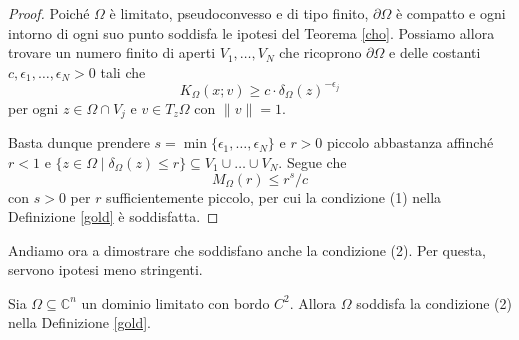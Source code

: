 \begin{proof}
    Poiché $\Omega$ è limitato, pseudoconvesso e di tipo finito, $\partial\Omega$ è compatto e ogni intorno di ogni suo punto soddisfa le ipotesi del Teorema \ref{cho}. Possiamo allora trovare un numero finito di aperti $V_1,\dots, V_N$ che ricoprono $\partial\Omega$ e delle costanti $c,\epsilon_1,\dots,\epsilon_N>0$ tali che
    $$K_\Omega(x;v) \ge c\cdot\delta_\Omega(z)^{-\epsilon_j}$$
    per ogni $z\in\Omega\cap V_j$ e $v\in T_z\Omega$ con $\|v\|=1$.

    Basta dunque prendere $s=\min\{\epsilon_1,\dots,\epsilon_N\}$ e $r>0$ piccolo abbastanza affinché $r<1$ e $\{z\in\Omega\mid\delta_\Omega(z) \le r\}\subseteq V_1\cup\dots\cup V_N$. Segue che
    $$M_\Omega(r) \le r^s/c$$
    con $s>0$ per $r$ sufficientemente piccolo, per cui la condizione (1) nella Definizione \ref{gold} è soddisfatta.
\end{proof}

Andiamo ora a dimostrare che soddisfano anche la condizione (2). Per questa, servono ipotesi meno stringenti.

\begin{prop} \label{finito_is_2}
    Sia $\Omega\subseteq\mathbb{C}^n$ un dominio limitato con bordo $C^2$. Allora $\Omega$ soddisfa la condizione (2) nella Definizione \ref{gold}.
\end{prop}

